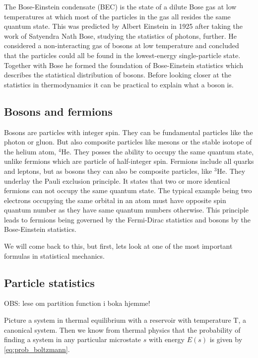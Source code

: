 The Bose-Einstein condensate (BEC) is the state of a dilute Bose gas at low temperatures at which most of the particles in the gas all resides the same quantum state. This was predicted by Albert Einstein in 1925 after taking the work of Satyendra Nath Bose, studying the statistics of photons, further. He considered a non-interacting gas of bosons at low temperature and concluded that the particles could all be found in the lowest-energy single-particle state. Together with Bose he formed the foundation of Bose-Einstein statistics which describes the statistical distribution of bosons. Before looking closer at the statistics in thermodynamics it can be practical to explain what a boson is.

\subsection{Bosons and fermions}
Bosons are particles with integer spin. They can be fundamental particles like the photon or gluon. But also composite particles like mesons or the stable isotope of the helium atom, $^4\text{He}$. They posses the ability to occupy the same quantum state, unlike fermions which are particle of half-integer spin. Fermions include all quarks and leptons, but as bosons they can also be composite particles, like $^3\text{He}$. They underlay the Pauli exclusion principle. It states that two or more identical fermions can not occupy the same quantum state. 
The typical example being two electrons occupying the same orbital in an atom must have opposite spin quantum number as they have same quantum numbers otherwise. 
This principle leads to fermions being governed by the Fermi-Dirac statistics and bosons by the Bose-Einstein statistics. 


We will come back to this, but first, lets look at one of the most important formulas in statistical mechanics. 

\subsection{Particle statistics}

OBS: lese om partition function i boka hjemme!


Picture a system in thermal equilibrium with a reservoir with temperature T, a canonical system. Then we know from thermal physics that the probability of finding a system in any particular microstate $s$ with energy $E(s)$ is given by \eqref{eq:prob_boltzmann}.

